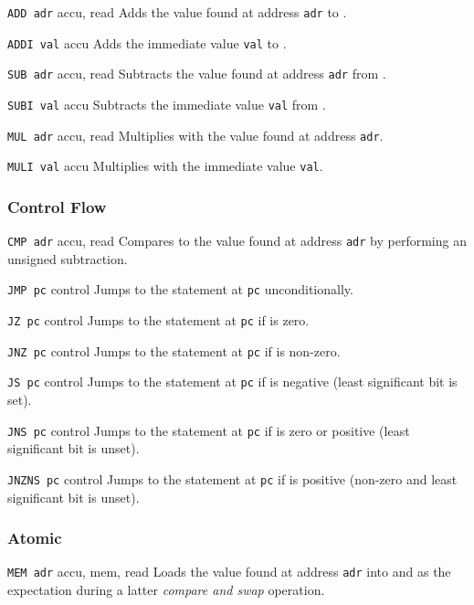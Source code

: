 {\texttt{ADD adr}}
{accu, read}
{Adds the value found at address \texttt{adr} to \accu.}

{\texttt{ADDI val}}
{accu}
{Adds the immediate value \texttt{val} to \accu.}

{\texttt{SUB adr}}
{accu, read}
{Subtracts the value found at address \texttt{adr} from \accu.}

{\texttt{SUBI val}}
{accu}
{Subtracts the immediate value \texttt{val} from \accu.}

{\texttt{MUL adr}}
{accu, read}
{Multiplies \accu{} with the value found at address \texttt{adr}.}

{\texttt{MULI val}}
{accu}
{Multiplies \accu{} with the immediate value \texttt{val}.}

\subsubsection{Control Flow}

{\texttt{CMP adr}}
{accu, read}
{Compares \accu{} to the value found at address \texttt{adr} by performing an unsigned subtraction.}

{\texttt{JMP pc}}
{control}
{Jumps to the statement at \texttt{pc} unconditionally.}

{\texttt{JZ pc}}
{control}
{Jumps to the statement at \texttt{pc} if \accu{} is zero.}

{\texttt{JNZ pc}}
{control}
{Jumps to the statement at \texttt{pc} if \accu{} is non-zero.}

{\texttt{JS pc}}
{control}
{Jumps to the statement at \texttt{pc} if \accu{} is negative (least significant bit is set).}

{\texttt{JNS pc}}
{control}
{Jumps to the statement at \texttt{pc} if \accu{} is zero or positive (least significant bit is unset).}

{\texttt{JNZNS pc}}
{control}
{Jumps to the statement at \texttt{pc} if \accu{} is positive (non-zero and least significant bit is unset).}

\subsubsection{Atomic}

{\texttt{MEM adr}}
{accu, mem, read}
{Loads the value found at address \texttt{adr} into \accu{} and \mem{} as the expectation during a latter \emph{compare and swap} operation.}

